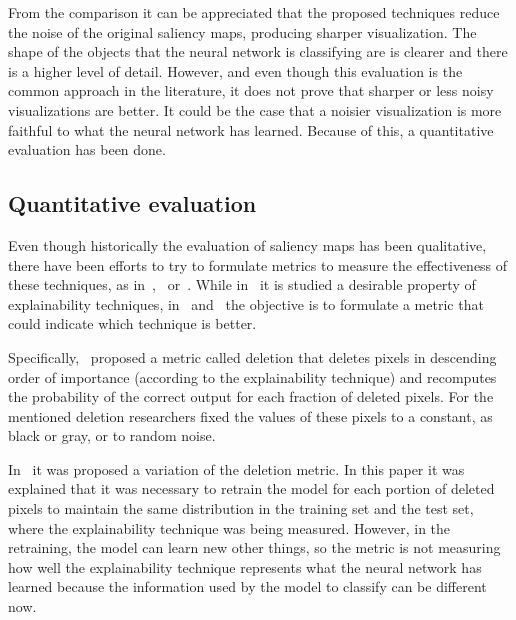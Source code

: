 \documentclass[preprint,12pt]{elsarticle}
\begin{document}
From the comparison it can be appreciated that the proposed techniques reduce the noise of the original saliency maps, producing sharper visualization. The shape of the objects that the neural network is classifying are is clearer and there is a higher level of detail. However, and even though this evaluation is the common approach in the literature, it does not prove that sharper or less noisy visualizations are better. It could be the case that a noisier visualization is more faithful to what the neural network has learned. Because of this, a quantitative evaluation has been done.

\subsection{Quantitative evaluation}

Even though historically the evaluation of saliency maps has been qualitative, there have been efforts to try to formulate metrics to measure the effectiveness of these techniques, as in~\cite{petsiukRISERandomizedInput},~\cite{hookerBenchmarkInterpretabilityMethods2019} or~\cite{anconaBetterUnderstandingGradientbased2018}. While in~\cite{anconaBetterUnderstandingGradientbased2018} it is studied a desirable property of explainability techniques, in~\cite{petsiukRISERandomizedInput} and~\cite{hookerBenchmarkInterpretabilityMethods2019} the objective is to formulate a metric that could indicate which technique is better. 

Specifically,~\cite{petsiukRISERandomizedInput} proposed a metric called deletion that deletes pixels in descending order of importance (according to the explainability technique) and recomputes the probability of the correct output for each fraction of deleted pixels. For the mentioned deletion researchers fixed the values of these pixels to a constant, as black or gray, or to random noise. 

In~\cite{hookerBenchmarkInterpretabilityMethods2019} it was proposed a variation of the deletion metric. In this paper it was explained that it was necessary to retrain the model for each portion of deleted pixels to maintain the same distribution in the training set and the test set, where the explainability technique was being measured. However, in the retraining, the model can learn new other things, so the metric is not measuring how well the explainability technique represents what the neural network has learned because the information used by the model to classify can be different now.
\end{document}
